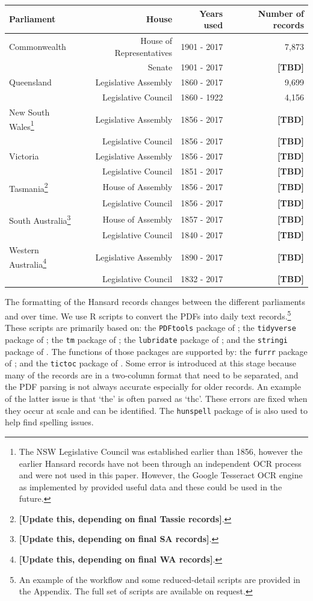\documentclass[12pt,]{article}
\theoremstyle{definition}
\theoremstyle{definition}
\theoremstyle{definition}
\theoremstyle{remark}
\begin{document}
\begin{longtable}[]{@{}lrrr@{}}
\toprule
Parliament & House & Years used & Number of records\tabularnewline
\midrule
\endhead
Commonwealth & House of Representatives & 1901 - 2017 &
7,873\tabularnewline
& Senate & 1901 - 2017 & \textbf{{[}TBD{]}}\tabularnewline
Queensland & Legislative Assembly & 1860 - 2017 & 9,699\tabularnewline
& Legislative Council & 1860 - 1922 & 4,156\tabularnewline
New South Wales\footnote{The NSW Legislative Council was established
  earlier than 1856, however the earlier Hansard records have not been
  through an independent OCR process and were not used in this paper.
  However, the Google Tesseract OCR engine as implemented by
  \citet{Ooms2018tesseract} provided useful data and these could be used
  in the future.} & Legislative Assembly & 1856 - 2017 &
\textbf{{[}TBD{]}}\tabularnewline
& Legislative Council & 1856 - 2017 & \textbf{{[}TBD{]}}\tabularnewline
Victoria & Legislative Assembly & 1856 - 2017 &
\textbf{{[}TBD{]}}\tabularnewline
& Legislative Council & 1851 - 2017 & \textbf{{[}TBD{]}}\tabularnewline
Tasmania\footnote{\textbf{{[}Update this, depending on final Tassie
  records{]}}.} & House of Assembly & 1856 - 2017 &
\textbf{{[}TBD{]}}\tabularnewline
& Legislative Council & 1856 - 2017 & \textbf{{[}TBD{]}}\tabularnewline
South Australia\footnote{\textbf{{[}Update this, depending on final SA
  records{]}}.} & House of Assembly & 1857 - 2017 &
\textbf{{[}TBD{]}}\tabularnewline
& Legislative Council & 1840 - 2017 & \textbf{{[}TBD{]}}\tabularnewline
Western Australia\footnote{\textbf{{[}Update this, depending on final WA
  records{]}}.} & Legislative Assembly & 1890 - 2017 &
\textbf{{[}TBD{]}}\tabularnewline
& Legislative Council & 1832 - 2017 & \textbf{{[}TBD{]}}\tabularnewline
\bottomrule
\end{longtable}

The formatting of the Hansard records changes between the different
parliaments and over time. We use R scripts to convert the PDFs into
daily text records.\footnote{An example of the workflow and some
  reduced-detail scripts are provided in the Appendix. The full set of
  scripts are available on request.} These scripts are primarily based
on: the \texttt{PDFtools} package of \citet{Ooms2018pdftools}; the
\texttt{tidyverse} package of \citet{Wickham2017}; the \texttt{tm}
package of \citet{FeinererHornik2018}; the \texttt{lubridate} package of
\citet{GrolemundWickham2011}; and the \texttt{stringi} package of
\citet{Gagolewski2018}. The functions of those packages are supported
by: the \texttt{furrr} package of \citet{VaughanDancho2018}; and the
\texttt{tictoc} package of \citet{Izrailev2014}. Some error is
introduced at this stage because many of the records are in a two-column
format that need to be separated, and the PDF parsing is not always
accurate especially for older records. An example of the latter issue is
that `the' is often parsed as `thc'. These errors are fixed when they
occur at scale and can be identified. The \texttt{hunspell} package of
\citet{Ooms2017} is also used to help find spelling issues.
\end{document}
